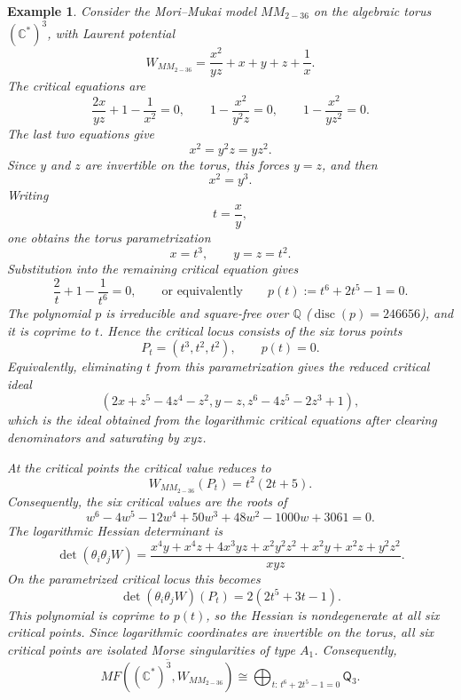 \documentclass[11pt]{amsart}
\newtheorem{example}{Example}[section]
\newcommand{\MorseCat}[1]{\mathsf{Q}_{#1}}
\begin{document}
\begin{example}
Consider the Mori--Mukai model $MM_{2-36}$ on the algebraic torus
$(\mathbb{C}^*)^3$, with Laurent potential
\[
W_{MM_{2-36}}=\frac{x^2}{yz}+x+y+z+\frac{1}{x}.
\]
The critical equations are
\[
\frac{2x}{yz}+1-\frac{1}{x^2}=0,
\qquad
1-\frac{x^2}{y^2z}=0,
\qquad
1-\frac{x^2}{yz^2}=0.
\]
The last two equations give
\[
x^2=y^2z=yz^2.
\]
Since $y$ and $z$ are invertible on the torus, this forces $y=z$, and then
\[
x^2=y^3.
\]
Writing
\[
t=\frac{x}{y},
\]
one obtains the torus parametrization
\[
x=t^3,
\qquad
y=z=t^2.
\]
Substitution into the remaining critical equation gives
\[
\frac{2}{t}+1-\frac{1}{t^6}=0,
\qquad\text{or equivalently}\qquad
p(t):=t^6+2t^5-1=0.
\]
The polynomial $p$ is irreducible and square-free over $\mathbb{Q}$
($\operatorname{disc}(p)=246656$), and it is coprime to $t$. Hence the
critical locus consists of the six torus points
\[
P_t=(t^3,t^2,t^2),
\qquad
p(t)=0.
\]
Equivalently, eliminating $t$ from this parametrization gives the reduced
critical ideal
\[
\left(
2x+z^5-4z^4-z^2,
y-z,
z^6-4z^5-2z^3+1
\right),
\]
which is the ideal obtained from the logarithmic critical equations after
clearing denominators and saturating by $xyz$.

At the critical points the critical value reduces to
\[
W_{MM_{2-36}}(P_t)=t^2(2t+5).
\]
Consequently, the six critical values are the roots of
\[
w^6-4w^5-12w^4+50w^3+48w^2-1000w+3061=0.
\]
The logarithmic Hessian determinant is
\[
\det(\theta_i\theta_jW)
=\frac{x^4y+x^4z+4x^3yz+x^2y^2z^2+x^2y+x^2z+y^2z^2}{xyz}.
\]
On the parametrized critical locus this becomes
\[
\det(\theta_i\theta_jW)(P_t)
=2(2t^5+3t-1).
\]
This polynomial is coprime to $p(t)$, so the Hessian is nondegenerate at all
six critical points. Since logarithmic coordinates are invertible on the
torus, all six critical points are isolated Morse singularities of type
$A_1$. Consequently,
\[
\overline{MF((\mathbb{C}^*)^3,W_{MM_{2-36}})}
\cong \bigoplus_{t:\,t^6+2t^5-1=0}\MorseCat{3}.
\]
\end{example}
\end{document}
